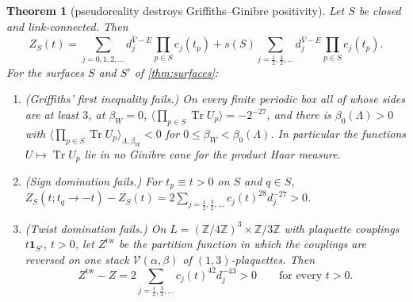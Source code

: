 \documentclass[11pt,a4paper]{amsart}
\newtheorem{theorem}{Theorem}[section]
\theoremstyle{definition}
\theoremstyle{remark}
\numberwithin{equation}{section}
\DeclareMathOperator{\Tr}{Tr}        %
\newcommand{\Z}{\mathbb{Z}}          %
\newcommand{\betaW}{\beta_{W}}             %
\begin{document}
\begin{theorem}[pseudoreality destroys Griffiths--Ginibre positivity]\label{thm:pseudoreality}
Let $S$ be closed and link-connected. Then
\begin{equation}\label{eq:surface-series}
Z_S(t)=\sum_{j=0,1,2,\dots}d_j^{\hat V-E}\prod_{p\in S}c_j(t_p)+s(S)\sum_{j=\frac12,\frac32,\dots}d_j^{\hat V-E}\prod_{p\in S}c_j(t_p).
\end{equation}
For the surfaces $S$ and $S'$ of \cref{thm:surfaces}:
\begin{enumerate}[label=\textup{(\alph*)},leftmargin=*]
\item \textup{(Griffiths' first inequality fails.)} On every finite periodic box all of whose sides are at least $3$, at $\betaW=0$, $\bigl\langle\prod_{p\in S}\Tr U_p\bigr\rangle=-2^{-27}$, and there is $\beta_0(\Lambda)>0$ with $\bigl\langle\prod_{p\in S}\Tr U_p\bigr\rangle_{\Lambda,\betaW}<0$ for $0\le\betaW<\beta_0(\Lambda)$. In particular the functions $U\mapsto\Tr U_p$ lie in no Ginibre cone for the product Haar measure.
\item \textup{(Sign domination fails.)} For $t_p\equiv t>0$ on $S$ and $q\in S$, $Z_S(t;t_q\to-t)-Z_S(t)=2\sum_{j=\frac12,\frac32,\dots}c_j(t)^{28}d_j^{-27}>0$.
\item \textup{(Twist domination fails.)} On $L=(\Z/4\Z)^3\times\Z/3\Z$ with plaquette couplings $t\mathbf 1_{S'}$, $t>0$, let $Z^{\mathrm{tw}}$ be the partition function in which the couplings are reversed on one stack $\mathcal V(\alpha,\beta)$ of $(1,3)$-plaquettes. Then
\[
Z^{\mathrm{tw}}-Z=2\sum_{j=\frac12,\frac32,\dots}c_j(t)^{42}d_j^{-43}>0\qquad\text{for every }t>0 .
\]
\end{enumerate}
\end{theorem}
\end{document}
